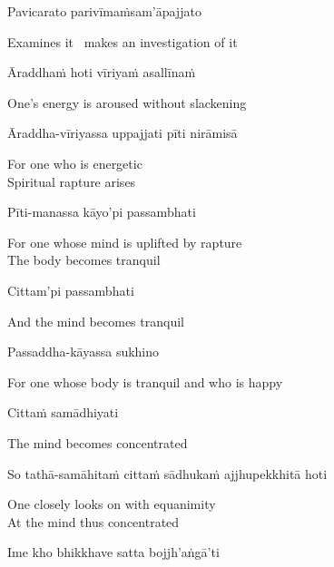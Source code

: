 Pavicarato parivīmaṁsam'āpajjato

\begin{english}
  Examines it \breathmark\ makes an investigation of it
\end{english}

Āraddhaṁ hoti vīriyaṁ asallīnaṁ

\begin{english}
  One's energy is aroused without slackening
\end{english}

Āraddha-vīriyassa uppajjati pīti nirāmisā

\begin{english}
  For one who is energetic\\
  Spiritual rapture arises
\end{english}

Pīti-manassa kāyo'pi passambhati

\begin{english}
  For one whose mind is uplifted by rapture\\
  The body becomes tranquil
\end{english}

Cittam'pi passambhati

\begin{english}
  And the mind becomes tranquil
\end{english}

Passaddha-kāyassa sukhino

\begin{english}
  For one whose body is tranquil and who is happy
\end{english}

\ifbfive\clearpage\fi

Cittaṁ samādhiyati

\begin{english}
  The mind becomes concentrated
\end{english}

\begin{pali-hang}
So tathā-samāhitaṁ cittaṁ sādhukaṁ ajjhupekkhitā hoti
\end{pali-hang}

\begin{english}
  One closely looks on with equanimity\\
  At the mind thus concentrated
\end{english}

\suttaRef{[SN 46.3]}

Ime kho bhikkhave satta bojjh'aṅgā'ti

